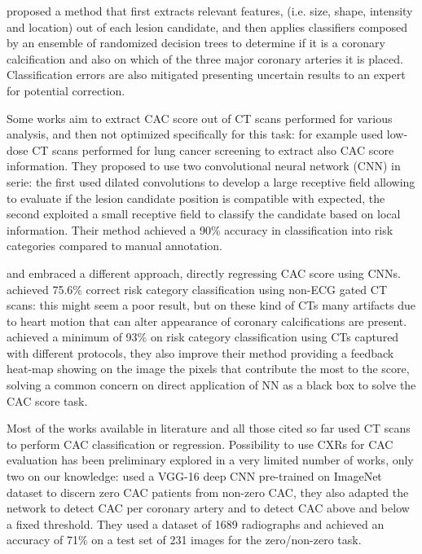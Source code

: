 \citeauthor{Wolterink2015-ii} \cite{Wolterink2015-ii} proposed a method that first extracts relevant features, (i.e. size, shape, intensity and location) out of each lesion candidate, and then applies classifiers composed by an ensemble of randomized decision trees to determine if it is a coronary calcification and also on which of the three major coronary arteries it is placed.
Classification errors are also mitigated presenting uncertain results to an expert for potential correction.

Some works aim to extract CAC score out of CT scans performed for various analysis, and then not optimized specifically for this task: \citeauthor{Lessmann_2018} \cite{Lessmann_2018} for example used low-dose CT scans performed for lung cancer screening to extract also CAC score information.
They proposed to use two convolutional neural network (CNN) in serie: the first used dilated convolutions to develop a large receptive field allowing to evaluate if the lesion candidate position is compatible with expected, the second exploited a small receptive field to classify the candidate based on local information.
Their method achieved a 90\% accuracy in classification into risk categories compared to manual annotation.

\citeauthor{Cano-Espinosa2018-gm} \cite{Cano-Espinosa2018-gm} and \citeauthor{de_Vos_2019} \cite{de_Vos_2019} embraced a different approach, directly regressing CAC score using CNNs.
\citeauthor{Cano-Espinosa2018-gm} achieved 75.6\% correct risk category classification using non-ECG gated CT scans: this might seem a poor result, but on these kind of CTs many artifacts due to heart motion that can alter appearance of coronary calcifications are present.
\citeauthor{de_Vos_2019} \cite{de_Vos_2019} achieved a minimum of 93\% on risk category classification using CTs captured with different protocols, they also improve their method providing a feedback heat-map showing on the image the pixels that contribute the most to the score, solving a common concern on direct application of NN as a black box to solve the CAC score task.

Most of the works available in literature and all those cited so far used CT scans to perform CAC classification or regression.
Possibility to use CXRs for CAC evaluation has been preliminary explored in a very limited number of works, only two on our knowledge:
\citeauthor{kamel_2021} \cite{kamel_2021} used a VGG-16 \cite{simonyan2015deep} deep CNN pre-trained on ImageNet dataset \cite{imagenet_cvpr09} to discern zero CAC patients from non-zero CAC, they also adapted the network to detect CAC per coronary artery and to detect CAC above and below a fixed threshold.
They used a dataset of 1689 radiographs and achieved an accuracy of 71\% on a test set of 231 images for the zero/non-zero task.

